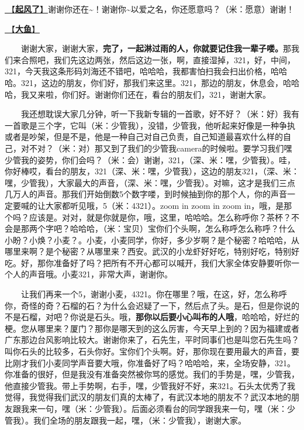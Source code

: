 \documentclass[]{ctexbook}
\begin{document}
\hyperref[the-wind-rises]{🎵【\textbf{起风了}】}谢谢你还在\textasciitilde！谢谢你\textasciitilde 以爱之名，你还愿意吗？（米：愿意）谢谢！

\hyperref[big-fish]{🎵【\textbf{大鱼}】}

  谢谢大家，谢谢大家，\textbf{完了，一起淋过雨的人，你就要记住我一辈子喽。}那我们来合照吧，我们先这边两张，然后这边一张，啊，直接湿掉，321，好，中间，321，今天我这条形码刘海还不错吧，哈哈哈，我都害怕扫我会扫出价格，哈哈哈。321，这边的朋友，你们好，那我们来这里。321，那边的朋友，休息会，哈哈哈，我又来啦，你们好。谢谢你们还在，看台的朋友们，321，谢谢大家。

  我还想耽误大家几分钟，听一下我新专辑的一首歌，好不好？（米：好）我有一首歌是三个字，它叫（米：少管我），没错，少管我，他听起来好像是一种争执或者是吵架，但是不是，他是一种自己对自己负责，自己知道最喜欢什么样的自己，对不对？（米：对）那又到了我们的少管我camera的时候啦。要学习我们嘿少管我的姿势，你们会吗？（米：会）谢谢，321，（深、米：嘿，少管我）。哇，你好棒哎，看台的朋友，321（深、米：嘿，少管我），这边的朋友321，（深、米：嘿，少管我），大家最大的声音，（深、米：嘿，少管我）。对嘛，这才是我们三点几万人的声音。那我们开始倒数5个数字喽，到时候抽到你的那个人，你的声音一定要喊的让大家都听见哦，5（米：4321）。zoom in zoom in zoom in，哦，是那个吗？应该是。对对，就是你就是你，哦，这里，哈哈哈。怎么称呼你？茶杯？不会是那两个字吧？哈哈哈，（米：宝贝）宝你们个头啊，怎么称呼怎么称呼？什么小盼？小焕？小麦？。小麦，小麦同学，你好，多少岁啊？是个秘密？哈哈哈，从哪里来啊？是个秘密？从哪里来？西安。武汉的小龙虾好好吃，特别好吃，特别好吃。好，那你准备好了吗？把所有不开心都可以喊开，我们大家全体安静要听你一个人的声音哦。小麦321，非常大声，谢谢你。

  让我们再来一个5，谢谢小麦，4321。你在哪里？哦，在这，好，怎么称呼你，奇怪的奇？石榴的石？为什么会迟疑了一下，然后点了头。是石，但是你说的不是石榴，对吧？你说是石头。哦，\textbf{那你以后要小心叫布的人哦}，哈哈哈，好烂的梗。您从哪里来？厦门？那你是哪天到的这么厉害，今天早上到的？因为福建或者广东那边台风影响比较大。谢谢你来了，石先生，平时同事们也是叫您石先生吗？叫你石头的比较多，石头你好。宝你们个头啊。好，那你现在要用最大的声音，要比刚才我们小麦同学声音要大哦，你准备好了吗？哈哈哈，来，全场安静，321。你准备的很好，但是我没有准备突然被你骂的感觉。我们的手势是，嘿，少管我，他直接少管我。带上手势啊，右手，嘿，少管我好不好，来321。石头太优秀了我觉得，我觉得我们武汉的朋友们真的太棒了，有武汉本地的朋友不？武汉本地的朋友跟我来一句，嘿（米：少管我）。后面必须看台的同学跟我来一句，嘿（米：少管我）。我们全场的朋友跟我一起，嘿，（米：少管我），谢谢大家。
\end{document}
